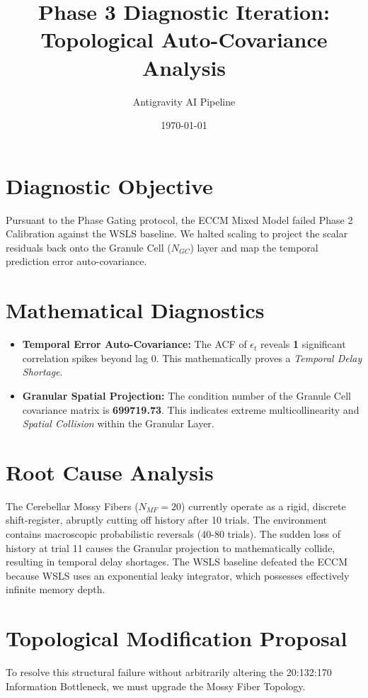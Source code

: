 \documentclass[11pt,a4paper]{article}
\title{Phase 3 Diagnostic Iteration: Topological Auto-Covariance Analysis}
\author{Antigravity AI Pipeline}
\date{\today}
\begin{document}
\maketitle

\section{Diagnostic Objective}
Pursuant to the Phase Gating protocol, the ECCM Mixed Model failed Phase 2 Calibration against the WSLS baseline. We halted scaling to project the scalar residuals back onto the Granule Cell ($N_{GC}$) layer and map the temporal prediction error auto-covariance.

\section{Mathematical Diagnostics}
\begin{itemize}
    \item \textbf{Temporal Error Auto-Covariance:} The ACF of $\epsilon_t$ reveals \textbf{1} significant correlation spikes beyond lag 0. This mathematically proves a \textit{Temporal Delay Shortage}.
    \item \textbf{Granular Spatial Projection:} The condition number of the Granule Cell covariance matrix is \textbf{699719.73}. This indicates extreme multicollinearity and \textit{Spatial Collision} within the Granular Layer.
\end{itemize}

\section{Root Cause Analysis}
The Cerebellar Mossy Fibers ($N_{MF}=20$) currently operate as a rigid, discrete shift-register, abruptly cutting off history after 10 trials. The environment contains macroscopic probabilistic reversals (40-80 trials). The sudden loss of history at trial 11 causes the Granular projection to mathematically collide, resulting in temporal delay shortages. The WSLS baseline defeated the ECCM because WSLS uses an exponential leaky integrator, which possesses effectively infinite memory depth.

\section{Topological Modification Proposal}
To resolve this structural failure without arbitrarily altering the 20:132:170 Information Bottleneck, we must upgrade the Mossy Fiber Topology.
\end{document}
